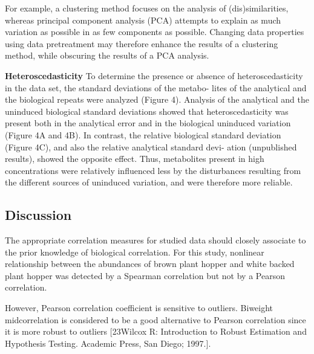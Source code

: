 For example, a clustering method focuses on the analysis of (dis)similarities, whereas principal component analysis (PCA) attempts to explain as much variation as possible in as few components as possible. Changing data properties using data pretreatment may therefore enhance the results of a clustering method, while obscuring the results of a PCA analysis.

\textbf{Heteroscedasticity}
To determine the presence or absence of heteroscedasticity in the data set, the standard deviations of the metabo- lites of the analytical and the biological repeats were analyzed (Figure 4). Analysis of the analytical and the uninduced biological standard deviations showed that heteroscedasticity was present both in the analytical error and in the biological uninduced variation (Figure 4A and 4B). In contrast, the relative biological standard deviation (Figure 4C), and also the relative analytical standard devi- ation (unpublished results), showed the opposite effect. Thus, metabolites present in high concentrations were relatively influenced less by the disturbances resulting from the different sources of uninduced variation, and were therefore more reliable.

\subsection{Discussion}
The appropriate correlation measures for studied data should closely associate to the prior knowledge of biological correlation. For this study, nonlinear relationship between the abundances of brown plant hopper and white backed plant hopper was detected by a Spearman correlation but not by a Pearson correlation.

However, Pearson correlation coefficient is sensitive to outliers. Biweight midcorrelation is considered to be a good alternative to Pearson correlation since it is more robust to outliers [23Wilcox R: Introduction to Robust Estimation and Hypothesis Testing. Academic Press, San Diego; 1997.].

